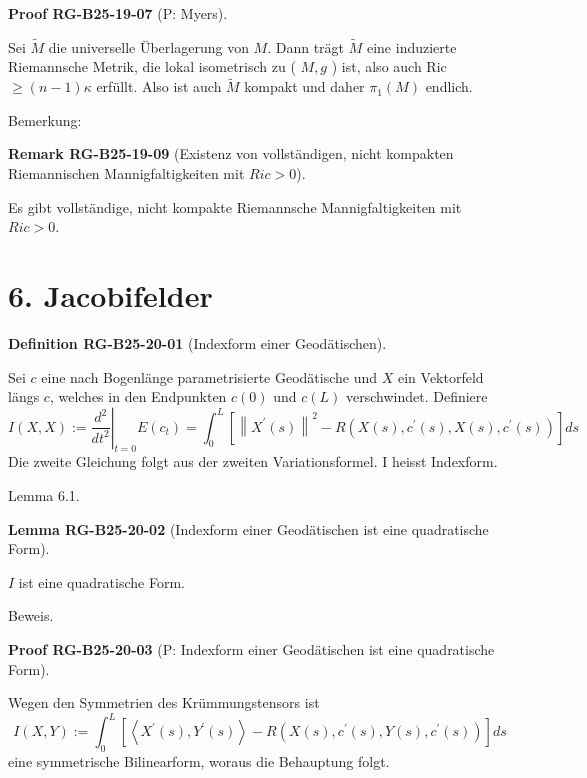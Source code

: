 \documentclass[10pt, letterpaper]{article}
\newcommand{\CustomHeading}[3]{%
  \par\medskip\noindent%
  \textbf{#1 #2} \textnormal{(#3)}.\enskip%
}
\newenvironment{DEF}[2]{\begin{unitbox}\CustomHeading{Definition}{#1}{#2}}{\end{unitbox}}
\newenvironment{LEM}[2]{\begin{unitbox}\CustomHeading{Lemma}{#1}{#2}}{\end{unitbox}}
\newenvironment{REM}[2]{\begin{unitbox}\CustomHeading{Remark}{#1}{#2}}{\end{unitbox}}
\newenvironment{PROOF}[2]{\begin{unitbox}\CustomHeading{Proof}{#1}{#2}}{\end{unitbox}}
\begin{document}
\begin{PROOF}{RG-B25-19-07}{P: Myers}
Sei $\tilde{M}$ die universelle Überlagerung von $M$. Dann trägt $\tilde{M}$ eine induzierte Riemannsche Metrik, die lokal isometrisch zu ( $M, g$ ) ist, also auch Ric $\geq(n-1) \kappa$ erfüllt. Also ist auch $\tilde{M}$ kompakt und daher $\pi_{1}(M)$ endlich.
\end{PROOF}



Bemerkung: 

\begin{REM}{RG-B25-19-09}{Existenz von vollständigen, nicht kompakten Riemannischen Mannigfaltigkeiten mit $Ric>0$}
Es gibt vollständige, nicht kompakte Riemannsche Mannigfaltigkeiten mit $Ric > 0$.
\end{REM}


\pagebreak




\section*{6. Jacobifelder}


\begin{DEF}{RG-B25-20-01}{Indexform einer Geodätischen}
Sei $c$ eine nach Bogenlänge parametrisierte Geodätische und $X$ ein Vektorfeld längs $c$, welches in den Endpunkten $c(0)$ und $c(L)$ verschwindet. Definiere
$$I(X, X):=\left.\frac{d^{2}}{d t^{2}}\right|_{t=0} E\left(c_{t}\right)=\int_{0}^{L}\left[\left\|X^{\prime}(s)\right\|^{2}-R\left(X(s), c^{\prime}(s), X(s), c^{\prime}(s)\right)\right] d s$$
Die zweite Gleichung folgt aus der zweiten Variationsformel. I heisst Indexform.
\end{DEF}


Lemma 6.1. 

\begin{LEM}{RG-B25-20-02}{Indexform einer Geodätischen ist eine quadratische Form}
$I$ ist eine quadratische Form.
\end{LEM}


Beweis. 

\begin{PROOF}{RG-B25-20-03}{P: Indexform einer Geodätischen ist eine quadratische Form}
Wegen den Symmetrien des Krümmungstensors ist
\begin{equation*}
I(X, Y):=\int_{0}^{L}\left[\left\langle X^{\prime}(s), Y^{\prime}(s)\right\rangle-R\left(X(s), c^{\prime}(s), Y(s), c^{\prime}(s)\right)\right] d s 
\end{equation*}
eine symmetrische Bilinearform, woraus die Behauptung folgt.
\end{PROOF}
\end{document}
